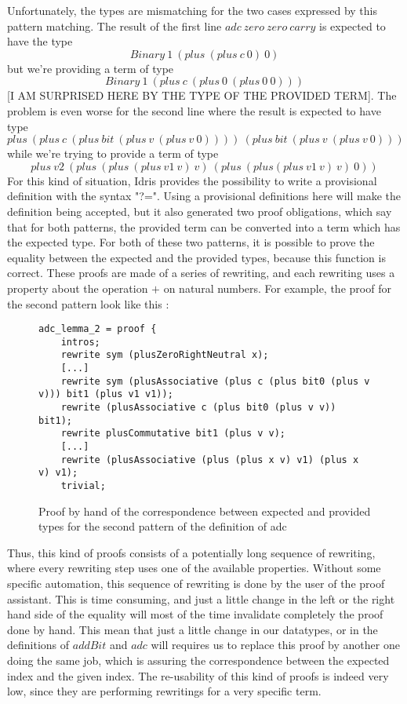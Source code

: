 Unfortunately, the types are mismatching for the two cases expressed by this pattern matching. The result of the first line $adc\ zero\ zero\ carry$ is expected to have the type\[Binary\ 1\ (plus\ (plus\ c\ 0)\ 0)\] but we're providing a term of type \[Binary\ 1\ (plus\ c\ (plus\ 0\ (plus\ 0\ 0)))\] [I AM SURPRISED HERE BY THE TYPE OF THE PROVIDED TERM].
The problem is even worse for the second line where the result is expected to have type \[plus\ (plus\ c\ (plus\ bit\ (plus\ v\ (plus\ v\ 0))))\ (plus\ bit\ (plus\ v\ (plus\ v\ 0)))\] while we're trying to provide a term of type \[plus\ v2\ (plus\ (plus\ (plus\ v1\ v)\ v)\ (plus\ (plus (plus\ v1\ v)\ v)\ 0))\]
For this kind of situation, Idris provides the possibility to write a provisional definition with the syntax "?=". Using a provisional definitions here will make the definition being accepted, but it also generated two proof obligations, which say that for both patterns, the provided term can be converted into a term which has the expected type.
For both of these two patterns, it is possible to prove the equality between the expected and the provided types, because this function is correct. These proofs are made of a series of rewriting, and each rewriting uses a property about the operation $+$ on natural numbers.
For example, the proof for the second pattern look like this :
\begin{figure}[H]
\figrule
\begin{center}
\begin{verbatim}
adc_lemma_2 = proof {
    intros;
    rewrite sym (plusZeroRightNeutral x);
    [...]
    rewrite sym (plusAssociative (plus c (plus bit0 (plus v v))) bit1 (plus v1 v1));
    rewrite (plusAssociative c (plus bit0 (plus v v)) bit1);
    rewrite plusCommutative bit1 (plus v v);
    [...]
    rewrite (plusAssociative (plus (plus x v) v1) (plus x v) v1);
    trivial;
\end{verbatim}
\end{center}
\caption{Proof by hand of the correspondence between expected and provided types for the second pattern of the definition of adc}
\figrule
\end{figure}


Thus, this kind of proofs consists of a potentially long sequence of rewriting, where every rewriting step uses one of the available properties. Without some specific automation, this sequence of rewriting is done by the user of the proof assistant. This is time consuming, and just a little change in the left or the right hand side of the equality will most of the time invalidate completely the proof done by hand. This mean that just a little change in our datatypes, or in the definitions of $addBit$ and $adc$ will requires us to replace this proof by another one doing the same job, which is assuring the correspondence between the expected index and the given index. The re-usability of this kind of proofs is indeed very low, since they are performing rewritings for a very specific term.

